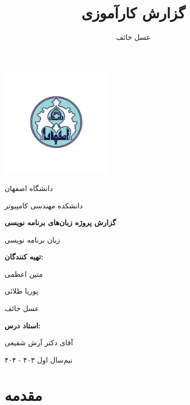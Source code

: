 \documentclass[12pt, a4paper]{report}
\title{گزارش کارآموزی}
\author{عسل خائف}
\begin{document}
	\begin{titlepage}
		\centering
		\includegraphics[width=0.4\textwidth]{img/university-logo.png}
		
		{\Large دانشگاه اصفهان}\par
		{\Large دانشکده مهندسی کامپیوتر}\par\vspace{2cm}
		
		\textbf
		{\Huge گزارش پروژه زبان‌های برنامه نویسی}\par\vspace{1.5cm}
		{\Huge زبان برنامه نویسی }\par\vspace{1.5cm}
		
		\large
		\textbf{تهیه کنندگان:}\par{متین اعظمی}\par{پوریا طلائی}\par{عسل خائف}\par\vspace{1cm}  

		\textbf{استاد درس:}\par{آقای دکتر آرش شفیعی}\par\vspace{3cm}
		
		\par{نیم‌سال اول ۴۰۳ - ۴۰۴}\par\vspace{0.5cm}
				
		
	\end{titlepage}
	\tableofcontents
	\listoftables
	
	
\chapter{مقدمه}
\end{document}

